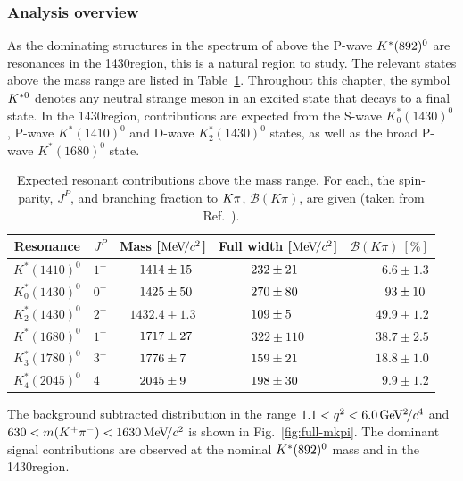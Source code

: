 \subsubsection{Analysis overview}

As the dominating structures in the \kpi spectrum of \BdToKpimm above the P-wave ${{K}^*}(892)^{0}$ are resonances in the 1430\mevcc region, this is a natural region to study. The relevant \Kstarz states above the \KstP mass range are listed in Table~\ref{tab:introduction:states}. Throughout this chapter, the symbol ${{K}^{*0}}$ denotes any neutral strange meson in an excited state that decays to a \Kp\pim final state. In the 1430\mevcc region, contributions are expected from the S-wave $K^\ast_0(1430)^0$, P-wave $K^\ast(1410)^0$ and D-wave $K^\ast_2(1430)^0$ states, as well as the broad P-wave $K^\ast(1680)^0$ state. 

\begin{table}[!tb]
\caption{Expected resonant contributions above the \KstP mass range. For each, the spin-parity, $J^P$, and branching fraction to ${K}{\pi}$, $\mathcal{B}(K\pi)$, are given (taken from Ref.~\cite{lu-wang}).}
\label{tab:introduction:states}
\centering
\begin{tabular}{c|c|c|c|r}
    Resonance & $J^{P}$ & Mass [$\mathrm{Me\kern -0.1em V\!/}c^2$] & Full width [$\mathrm{Me\kern -0.1em V\!/}c^2$]  & $\mathcal{B}(K\pi)~[\%]$ \\
   \hline
   $K^\ast(1410)^0$ & $1^{-}$& $\hphantom{0.}1414 \pm 15\hphantom{.}$& $232 \pm 21\hphantom{0}$  & $6.6 \pm 1.3$ \\
   $K^\ast_0(1430)^0$ & $0^{+}$ & $\hphantom{0.}1425 \pm 50\hphantom{.}$ & $270 \pm 80\hphantom{0}$ & $\hphantom{.}93 \pm 10\hphantom{.}$ \\
   $K^\ast_2(1430)^0$ & $2^{+}$ & $1432.4\pm 1.3$ & $109 \pm 5\hphantom{00}$ & $49.9 \pm 1.2$ \\
   $K^\ast(1680)^0$ & $1^{-}$ & $\hphantom{0.}1717 \pm 27\hphantom{.}$ & $322 \pm 110$ & $38.7 \pm 2.5$ \\
   $K^\ast_3(1780)^0$ & $3^{-}$ & $\hphantom{0.}1776 \pm 7\hphantom{0.}$ & $159 \pm 21\hphantom{0}$ & $18.8 \pm 1.0$ \\
   $K^\ast_4(2045)^0$ & $4^{+}$ & $\hphantom{0.}2045 \pm 9\hphantom{0.}$ & $198 \pm 30\hphantom{0}$ & $9.9 \pm 1.2$ \\
 \end{tabular}
 \end{table}

The background subtracted \mkpi distribution in the range $1.1<{q^2}<6.0{\mathrm{\,Ge\kern -0.1em V^2\!/}c^4}$ and $630<m({{K}^+}{{\pi}^-})<1630{\mathrm{\,Me\kern -0.1em V\!/}c^2}$ is shown in Fig.~\ref{fig:full-mkpi}. The dominant signal contributions are observed at the nominal ${{K}^*}(892)^{0}$ mass and in the 1430\mevcc region. 

